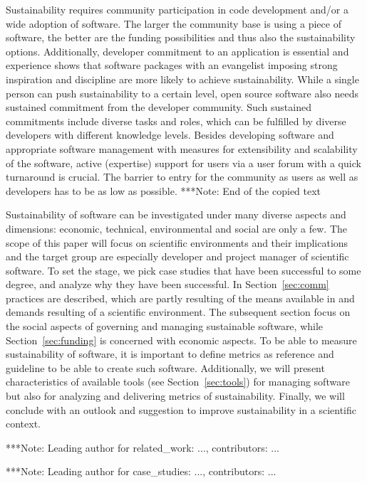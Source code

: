 \documentclass[11pt, oneside]{amsart}
\newcommand{\note}[1]{ {\textcolor{blueish}    { ***Note:      #1 }}}
\begin{document}
Sustainability requires community participation in code development and/or a
wide adoption of software. The larger the community base is using a piece of
software, the better are the funding possibilities and thus also the
sustainability options. Additionally, developer commitment to an application is
essential and experience shows that software packages with an evangelist
imposing strong inspiration and discipline are more likely to achieve
sustainability. While a single person can push sustainability to a certain
level, open source software also needs sustained commitment from the developer
community. Such sustained commitments include diverse tasks and roles, which can
be fulfilled by diverse developers with different knowledge levels. Besides
developing software and appropriate software management with measures for
extensibility and scalability of the software, active (expertise) support for
users via a user forum with a quick turnaround is crucial. The barrier to entry
for the community as users as well as developers has to be as low as possible.
\note{End of the copied text}

Sustainability of software can be investigated under many diverse aspects and dimensions: 
economic, technical, environmental and social are only a few. The scope of this paper will focus 
on scientific environments and their implications and the target group are especially developer 
and project manager of scientific software. To set the stage, we pick case studies that have been 
successful to some degree, and analyze why they have been successful. In Section~\ref{sec:comm}  
practices are described, which are partly resulting of the means available in and demands resulting of a scientific environment. 
The subsequent section focus on the social aspects of governing and managing sustainable software, 
while Section~\ref{sec:funding} is concerned with economic aspects. To be able to measure sustainability of 
software, it is important to define metrics as reference and guideline to be able to create such 
software. Additionally, we will present characteristics of available tools (see Section~\ref{sec:tools}) 
for managing software but also for analyzing and delivering metrics of sustainability. Finally, 
we will conclude with an outlook and suggestion to improve sustainability in a scientific context.  

\note{Leading author for related_work: ..., contributors: ...}


\note{Leading author for case_studies: ..., contributors: ...}

\end{document}
